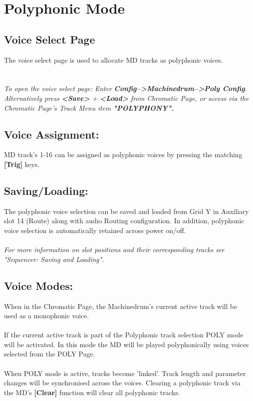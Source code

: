 \chapter{Polyphonic Mode}

\section{Voice Select Page}
The voice select page is used to allocate MD tracks as polyphonic voices.\\
\\\\
\textit{To open the voice select page: Enter \textbf{Config-->Machinedrum-->Poly Config}.\\Alternatively press \textbf{<Save>} + \textbf{<Load>} from  Chromatic Page, or access via the Chromatic Page's Track Menu item \textbf{"POLYPHONY".}}
\section{Voice Assignment:}
MD track's 1-16 can be assigned as polyphonic voices by pressing the matching \textbf{[Trig]} keys.
\section{Saving/Loading:}
The polyphonic voice selection can be saved and loaded from Grid Y in Auxiliary slot 14 (Route) along with audio Routing configuration. In addition, polyphonic voice selection is automatically retained across power on/off.
\\\\
\textit{For more information on slot positions and their corresponding tracks see  "Sequencer: Saving and Loading".}
\section{Voice Modes:}
When in the Chromatic Page, the Machinedrum's current active track will be used as a monophonic voice.\\
\\
If the current active track is part of the Polyphonic track selection POLY mode will be activated. In this mode the MD will be played polyphonically using voices selected from the POLY Page.\\
\\
When POLY mode is active, tracks become 'linked'. Track length and parameter changes will be synchronised across the voices. Clearing a polyphonic track via the MD's \textbf{[Clear]} function will clear all polyphonic tracks.
\newpage

